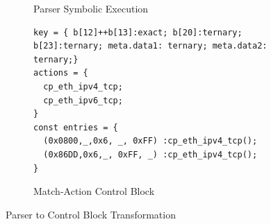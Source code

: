 \documentclass{hotnets19}
\begin{document}
\begin{figure}[!h]
\begin{subfigure}[b]{0.28\linewidth}
        \caption{Parser Symbolic Execution}
        \label{subfig:parser-symbolic-execution}
    \end{subfigure}
    \begin{subfigure}[b]{.45\linewidth}
\begin{lstlisting}[frame=none]
key = { b[12]++b[13]:exact; b[20]:ternary; b[23]:ternary; meta.data1: ternary; meta.data2: ternary;}
actions = {
  cp_eth_ipv4_tcp;
  cp_eth_ipv6_tcp;
}
const entries = {
  (0x0800,_,0x6, _, 0xFF) :cp_eth_ipv4_tcp();
  (0x86DD,0x6,_, 0xFF, _) :cp_eth_ipv4_tcp();
}
\end{lstlisting}
\caption{Match-Action Control Block}
\label{subfig:parser-mat}
\end{subfigure}
\caption{Parser to Control Block Transformation}
\label{fig:parser-to-control-block-transformation}
\end{figure}

% 
% 


% 
\end{document}
